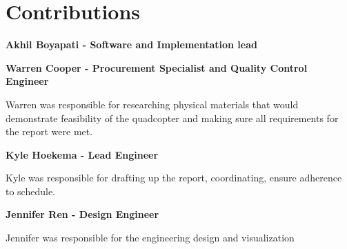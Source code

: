 \documentclass[11pt]{article}
\begin{document}
\section{Contributions}
\par \textbf{Akhil Boyapati - Software and Implementation lead}
\vspace{0.1in}
\par \textbf{Warren Cooper - Procurement Specialist and Quality Control Engineer}
\par Warren was responsible for researching physical materials that would demonstrate feasibility of the quadcopter and making sure all requirements for the report were met. %
\vspace{0.1in}
\par \textbf{Kyle Hoekema - Lead Engineer}
\par Kyle was responsible for drafting up the report, coordinating, ensure adherence to schedule. %
\vspace{0.1in}
\par \textbf{Jennifer Ren - Design Engineer}
\par Jennifer was responsible for the engineering design and visualization %


\newpage
\printbibliography
\end{document}
